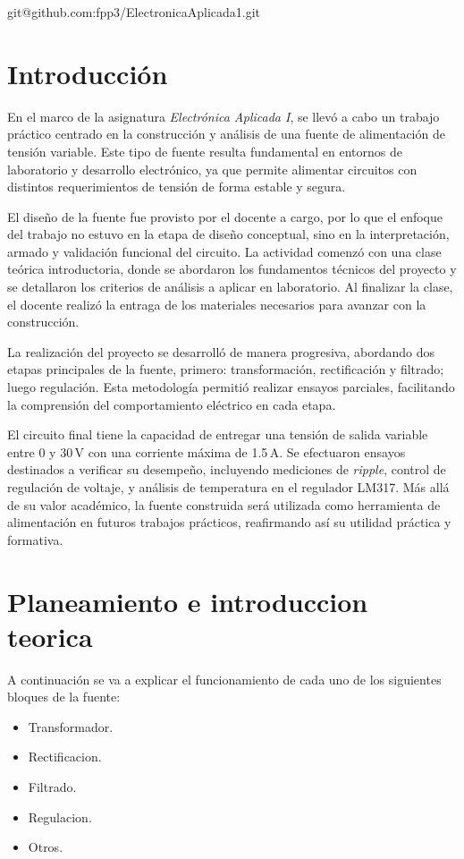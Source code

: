 \documentclass[chaptersright]{informeutn}
\begin{document}
  \maketitle

  \tableofcontents
  \setcounter{page}{1}
  \thispagestyle{plain}git@github.com:fpp3/ElectronicaAplicada1.git

  \chapter{Introducción} 

    En el marco de la asignatura \textit{Electrónica Aplicada I}, se llevó a cabo un trabajo práctico centrado en la
    construcción y análisis de una fuente de alimentación de tensión variable. Este tipo de fuente resulta fundamental
    en entornos de laboratorio y desarrollo electrónico, ya que permite alimentar circuitos con distintos
    requerimientos de tensión de forma estable y segura.

    El diseño de la fuente fue provisto por el docente a cargo, por lo que el enfoque del trabajo no estuvo en la etapa
    de diseño conceptual, sino en la interpretación, armado y validación funcional del circuito. La actividad comenzó
    con una clase teórica introductoria, donde se abordaron los fundamentos técnicos del proyecto y se detallaron los
    criterios de análisis a aplicar en laboratorio. Al finalizar la clase, el docente realizó la entraga de los 
    materiales necesarios para avanzar con la construcción.

    La realización del proyecto se desarrolló de manera progresiva, abordando dos etapas principales de la
    fuente, primero: transformación, rectificación y filtrado; luego regulación. Esta metodología permitió realizar 
    ensayos parciales, facilitando la comprensión del comportamiento eléctrico en cada etapa.

    El circuito final tiene la capacidad de entregar una tensión de salida variable entre 0 y 30\,V con una corriente
    máxima de 1.5\,A. Se efectuaron ensayos destinados a verificar su desempeño, incluyendo mediciones de
    \textit{ripple}, control de regulación de voltaje, y análisis de temperatura en el regulador LM317. Más allá de su
    valor académico, la fuente construida será utilizada como herramienta de alimentación en futuros trabajos
    prácticos, reafirmando así su utilidad práctica y formativa.

  \chapter{Planeamiento e introduccion teorica}
    A continuación se va a explicar el funcionamiento de cada uno de los siguientes bloques de la fuente:
    \begin{itemize}
      \item Transformador.
      \item Rectificacion.
      \item Filtrado.
      \item Regulacion.
      \item Otros.
    \end{itemize}
        
\end{document}
